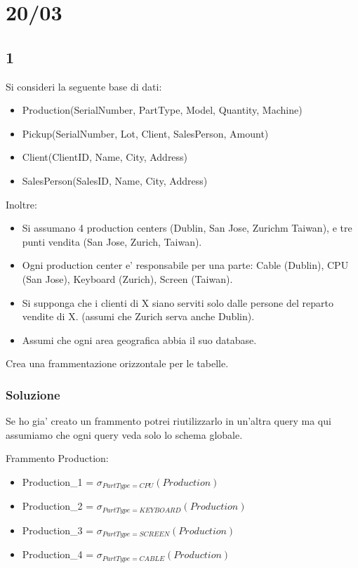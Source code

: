 \chapter{20/03}

\section{1}

Si consideri la seguente base di dati:

\begin{itemize}
  \item Production(SerialNumber, PartType, Model, Quantity, Machine)
  \item Pickup(SerialNumber, Lot, Client, SalesPerson, Amount)
  \item Client(ClientID, Name, City, Address)
  \item SalesPerson(SalesID, Name, City, Address)
\end{itemize}

Inoltre:
\begin{itemize}
  \item Si assumano 4 production centers (Dublin, San Jose, Zurichm Taiwan), e tre punti vendita (San Jose, Zurich, Taiwan).
  \item Ogni production center e' responsabile per una parte: Cable (Dublin), CPU (San Jose), Keyboard (Zurich), Screen (Taiwan).
  \item Si supponga che i clienti di X siano serviti solo dalle persone del reparto vendite di X. (assumi che Zurich serva anche Dublin).
  \item Assumi che ogni area geografica abbia il suo database.
\end{itemize}

Crea una frammentazione orizzontale per le tabelle.


\subsection{Soluzione}

Se ho gia' creato un frammento potrei riutilizzarlo in un'altra query ma qui assumiamo che ogni query veda solo lo schema globale.

Frammento Production:
\begin{itemize}
  \item Production\_1 = $\sigma _ {PartType = CPU} (Production)$
  \item Production\_2 = $\sigma _ {PartType = KEYBOARD} (Production)$
  \item Production\_3 = $\sigma _ {PartType = SCREEN} (Production)$
  \item Production\_4 = $\sigma _ {PartType = CABLE} (Production)$
\end{itemize}

